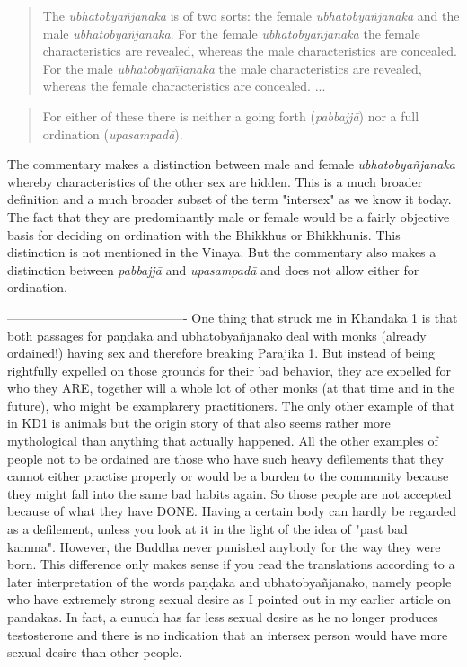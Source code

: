 \medskip

\begin{quote}
The {\em ubhatob­yañ­janaka} is of two sorts: the female {\em ubhatob­yañ­janaka} and the male {\em ubhatob­yañ­janaka}. For the female {\em ubhatob­yañ­janaka} the female characteristics are revealed, whereas the male characteristics are concealed. For the male {\em ubhatob­yañ­janaka} the male characteristics are revealed, whereas the female characteristics are concealed. ... 
\end{quote}
\begin{quote}
For either of these there is neither a going forth ({\em pabbajjā}) nor a full ordination ({\em upasampadā}).
\end{quote}

The commentary makes a distinction between male and female {\em ubhatob­yañ­janaka} whereby characteristics of the other sex are hidden. This is a much broader definition and a much broader subset of the term "intersex" as we know it today. The fact that they are predominantly male or female would be a fairly objective basis for deciding on ordination with the Bhikkhus or Bhikkhunis. This distinction is not mentioned in the Vinaya. But the commentary also makes a distinction between {\em pabbajjā} and {\em upasampadā} and does not allow either for ordination.





-------------------------------------------
One thing that struck me in Khandaka 1 is that both passages for paṇḍaka and ubhatobyañjanako deal with monks (already ordained!) having sex and therefore breaking Parajika 1. But instead of being rightfully expelled on those grounds for their bad behavior, they are expelled for who they ARE, together will a whole lot of other monks (at that time and in the future), who might be examplarery practitioners. The only other example of that in KD1 is animals but the origin story of that also seems rather more mythological than anything that actually happened. All the other examples of people not to be ordained are those who have such heavy defilements that they cannot either practise properly or would be a burden to the community because they might fall into the same bad habits again. So those people are not accepted because of what they have DONE. Having a certain body can hardly be regarded as a defilement, unless you look at it in the light of the idea of "past bad kamma". However, the Buddha never punished anybody for the way they were born.
This difference only makes sense if you read the translations according to a later interpretation of the words paṇḍaka and ubhatobyañjanako, namely people who have extremely strong sexual desire as I pointed out in my earlier article on pandakas. In fact, a eunuch has far less sexual desire as he no longer produces testosterone and there is no indication that an intersex person would have more sexual desire than other people. 
